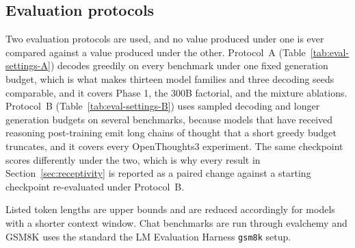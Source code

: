 \subsection{Evaluation protocols}
\label{app:protocols}

Two evaluation protocols are used, and no value produced under one is ever compared
against a value produced under the other. Protocol~A
(Table~\ref{tab:eval-settings-A}) decodes greedily on every benchmark under one fixed
generation budget, which is what makes thirteen model families and three decoding seeds
comparable, and it covers Phase 1, the 300B factorial, and the mixture ablations.
Protocol~B (Table~\ref{tab:eval-settings-B}) uses sampled decoding and longer generation
budgets on several benchmarks, because models that have received reasoning post-training
emit long chains of thought that a short greedy budget truncates, and it covers every
OpenThoughts3 experiment. The same checkpoint scores differently under the two, which is
why every result in Section~\ref{sec:receptivity} is reported as a paired change against
a starting checkpoint re-evaluated under Protocol~B.

Listed token lengths are upper bounds and are reduced accordingly for models with a
shorter context window. Chat benchmarks are run through \textsf{evalchemy} and GSM8K uses
the standard the LM Evaluation Harness \texttt{gsm8k} setup.

